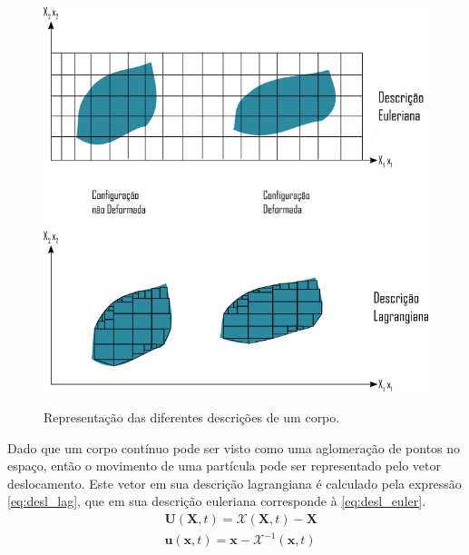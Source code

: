 \begin{figure}[H]
    \centering
    \caption{Representação das diferentes descrições de um corpo.}
    \includegraphics[width=0.8\linewidth]{images/EulervsLagrange.png}
    \label{fig:Euler_Lagrange}
\end{figure}


Dado que um corpo contínuo pode ser visto como uma aglomeração de pontos no espaço, então o movimento de uma partícula pode ser representado pelo vetor deslocamento. Este vetor em sua descrição lagrangiana é calculado pela expressão \ref{eq:desl_lag}, que em sua descrição euleriana corresponde à \ref{eq:desl_euler}.
\begin{align}
&\boldsymbol{U}(\boldsymbol{X},t) = \mathcal{X}(\boldsymbol{X},t) - \boldsymbol{X}
\label{eq:desl_lag}\\
&\boldsymbol{u}(\boldsymbol{x},t) = \boldsymbol{x} - \mathcal{X}^{-1}(\boldsymbol{x},t)
\label{eq:desl_euler}
\end{align}

